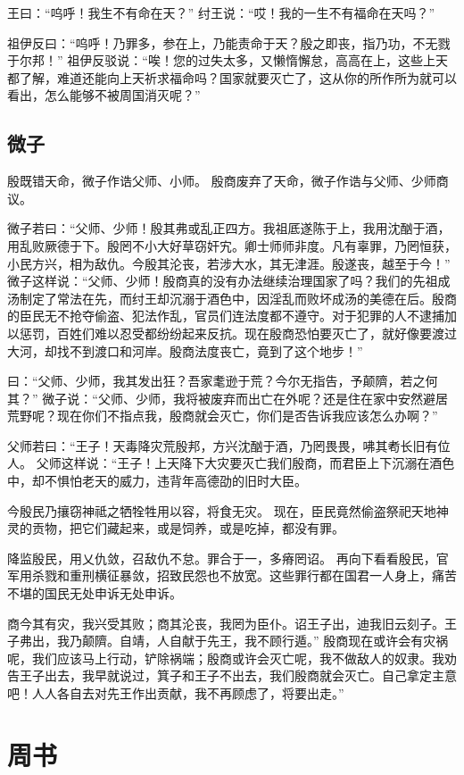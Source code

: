 \documentclass[a4paper,12pt,UTF8,twoside]{ctexbook}
\begin{document}
王曰：“呜呼！我生不有命在天？”
纣王说：“哎！我的一生不有福命在天吗？”

祖伊反曰：“呜呼！乃罪多，参在上，乃能责命于天？殷之即丧，指乃功，不无戮于尔邦！”
祖伊反驳说：“唉！您的过失太多，又懒惰懈怠，高高在上，这些上天都了解，难道还能向上天祈求福命吗？国家就要灭亡了，这从你的所作所为就可以看出，怎么能够不被周国消灭呢？”

\chapter{微子}

殷既错天命，微子作诰父师、小师。
殷商废弃了天命，微子作诰与父师、少师商议。

微子若曰：“父师、少师！殷其弗或乱正四方。我祖厎遂陈于上，我用沈酗于酒，用乱败厥德于下。殷罔不小大好草窃奸宄。卿士师师非度。凡有辜罪，乃罔恒获，小民方兴，相为敌仇。今殷其沦丧，若涉大水，其无津涯。殷遂丧，越至于今！”
微子这样说：“父师、少师！殷商真的没有办法继续治理国家了吗？我们的先祖成汤制定了常法在先，而纣王却沉溺于酒色中，因淫乱而败坏成汤的美德在后。殷商的臣民无不抢夺偷盗、犯法作乱，官员们连法度都不遵守。对于犯罪的人不逮捕加以惩罚，百姓们难以忍受都纷纷起来反抗。现在殷商恐怕要灭亡了，就好像要渡过大河，却找不到渡口和河岸。殷商法度丧亡，竟到了这个地步！”

曰：“父师、少师，我其发出狂？吾家耄逊于荒？今尔无指告，予颠隮，若之何其？”
微子说：“父师、少师，我将被废弃而出亡在外呢？还是住在家中安然避居荒野呢？现在你们不指点我，殷商就会灭亡，你们是否告诉我应该怎么办啊？”

父师若曰：“王子！天毒降灾荒殷邦，方兴沈酗于酒，乃罔畏畏，咈其耇长旧有位人。
父师这样说：“王子！上天降下大灾要灭亡我们殷商，而君臣上下沉溺在酒色中，却不惧怕老天的威力，违背年高德劭的旧时大臣。

今殷民乃攘窃神祗之牺牷牲用以容，将食无灾。
现在，臣民竟然偷盗祭祀天地神灵的贡物，把它们藏起来，或是饲养，或是吃掉，都没有罪。

降监殷民，用乂仇敛，召敌仇不怠。罪合于一，多瘠罔诏。
再向下看看殷民，官军用杀戮和重刑横征暴敛，招致民怨也不放宽。这些罪行都在国君一人身上，痛苦不堪的国民无处申诉无处申诉。

商今其有灾，我兴受其败；商其沦丧，我罔为臣仆。诏王子出，迪我旧云刻子。王子弗出，我乃颠隮。自靖，人自献于先王，我不顾行遁。”
殷商现在或许会有灾祸呢，我们应该马上行动，铲除祸端；殷商或许会灭亡呢，我不做敌人的奴隶。我劝告王子出去，我早就说过，箕子和王子不出去，我们殷商就会灭亡。自己拿定主意吧！人人各自去对先王作出贡献，我不再顾虑了，将要出走。”

\part{周书}
\end{document}
